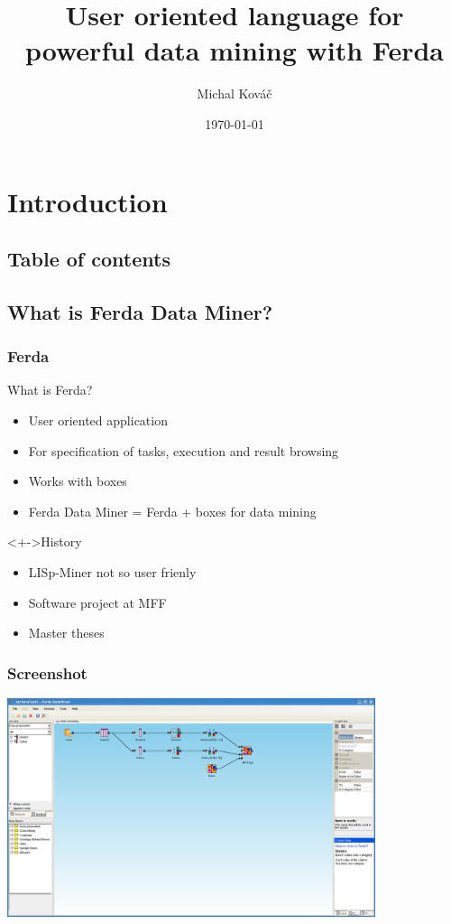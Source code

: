 \documentclass{beamer}
\author{Michal Kov\'{a}\v{c}}
\title{User oriented language for powerful data mining with Ferda}
\date{\today}
\begin{document}
\frame{\titlepage}

\section{Introduction}
\subsection{Table of contents}


\subsection{What is Ferda Data Miner?}
\begin{frame}
	\frametitle{Ferda}
	\begin{block}{What is Ferda?}
		\begin{itemize}[<+->]
			\item User oriented application
			\item For specification of tasks, execution and result browsing
			\item Works with boxes
			\item Ferda Data Miner = Ferda + boxes for data mining
		\end{itemize}
	\end{block}
	\begin{block}<+->{History}
		\begin{itemize}[<+->]
			\item LISp-Miner not so user frienly
			\item Software project at MFF
			\item Master theses
		\end{itemize}
	\end{block}
\end{frame}

\begin{frame}
	\frametitle{Screenshot}
	\includegraphics[width=10.8cm]{ferda}
\end{frame}
\end{document}

